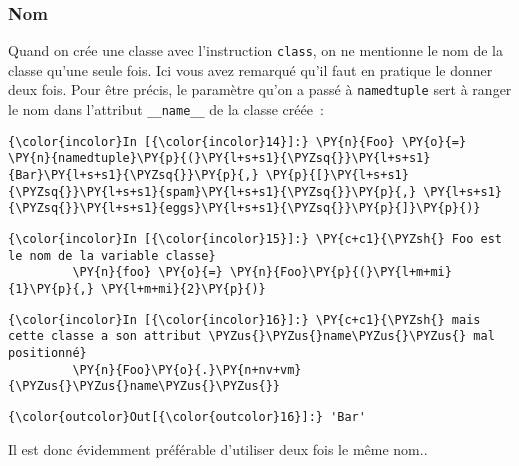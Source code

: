     \hypertarget{nom}{%
\subsubsection{Nom}\label{nom}}

    Quand on crée une classe avec l'instruction \texttt{class}, on ne
mentionne le nom de la classe qu'une seule fois. Ici vous avez remarqué
qu'il faut en pratique le donner deux fois. Pour être précis, le
paramètre qu'on a passé à \texttt{namedtuple} sert à ranger le nom dans
l'attribut \texttt{\_\_name\_\_} de la classe créée~:

    \begin{Verbatim}[commandchars=\\\{\},frame=single,framerule=0.3mm,rulecolor=\color{cellframecolor}]
{\color{incolor}In [{\color{incolor}14}]:} \PY{n}{Foo} \PY{o}{=} \PY{n}{namedtuple}\PY{p}{(}\PY{l+s+s1}{\PYZsq{}}\PY{l+s+s1}{Bar}\PY{l+s+s1}{\PYZsq{}}\PY{p}{,} \PY{p}{[}\PY{l+s+s1}{\PYZsq{}}\PY{l+s+s1}{spam}\PY{l+s+s1}{\PYZsq{}}\PY{p}{,} \PY{l+s+s1}{\PYZsq{}}\PY{l+s+s1}{eggs}\PY{l+s+s1}{\PYZsq{}}\PY{p}{]}\PY{p}{)}
\end{Verbatim}


    \begin{Verbatim}[commandchars=\\\{\},frame=single,framerule=0.3mm,rulecolor=\color{cellframecolor}]
{\color{incolor}In [{\color{incolor}15}]:} \PY{c+c1}{\PYZsh{} Foo est le nom de la variable classe}
         \PY{n}{foo} \PY{o}{=} \PY{n}{Foo}\PY{p}{(}\PY{l+m+mi}{1}\PY{p}{,} \PY{l+m+mi}{2}\PY{p}{)}
\end{Verbatim}


    \begin{Verbatim}[commandchars=\\\{\},frame=single,framerule=0.3mm,rulecolor=\color{cellframecolor}]
{\color{incolor}In [{\color{incolor}16}]:} \PY{c+c1}{\PYZsh{} mais cette classe a son attribut \PYZus{}\PYZus{}name\PYZus{}\PYZus{} mal positionné}
         \PY{n}{Foo}\PY{o}{.}\PY{n+nv+vm}{\PYZus{}\PYZus{}name\PYZus{}\PYZus{}}
\end{Verbatim}


\begin{Verbatim}[commandchars=\\\{\},frame=single,framerule=0.3mm,rulecolor=\color{cellframecolor}]
{\color{outcolor}Out[{\color{outcolor}16}]:} 'Bar'
\end{Verbatim}
            
    Il est donc évidemment préférable d'utiliser deux fois le même nom..

